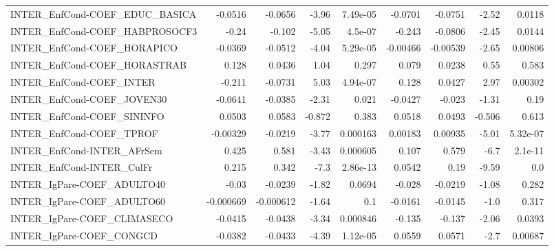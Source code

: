 \begin{tabular}{lrrrrrrrr}
INTER\_EnfCond-COEF\_EDUC\_BASICA        &     -0.0516 &      -0.0656 &    -3.96 & 7.49e-05 &    -0.0701 &     -0.0751 &        -2.52 &        0.0118 \\
INTER\_EnfCond-COEF\_HABPROSOCF3        &       -0.24 &       -0.102 &    -5.05 &  4.5e-07 &     -0.243 &     -0.0806 &        -2.45 &        0.0144 \\
INTER\_EnfCond-COEF\_HORAPICO           &     -0.0369 &      -0.0512 &    -4.04 & 5.29e-05 &   -0.00466 &    -0.00539 &        -2.65 &       0.00806 \\
INTER\_EnfCond-COEF\_HORASTRAB          &       0.128 &       0.0436 &     1.04 &    0.297 &      0.079 &      0.0238 &         0.55 &         0.583 \\
INTER\_EnfCond-COEF\_INTER              &      -0.211 &      -0.0731 &     5.03 & 4.94e-07 &      0.128 &      0.0427 &         2.97 &       0.00302 \\
INTER\_EnfCond-COEF\_JOVEN30            &     -0.0641 &      -0.0385 &    -2.31 &    0.021 &    -0.0427 &      -0.023 &        -1.31 &          0.19 \\
INTER\_EnfCond-COEF\_SININFO            &      0.0503 &       0.0583 &   -0.872 &    0.383 &     0.0518 &      0.0493 &       -0.506 &         0.613 \\
INTER\_EnfCond-COEF\_TPROF              &    -0.00329 &      -0.0219 &    -3.77 & 0.000163 &    0.00183 &     0.00935 &        -5.01 &      5.32e-07 \\
INTER\_EnfCond-INTER\_AFrSem            &       0.425 &        0.581 &    -3.43 & 0.000605 &      0.107 &       0.579 &         -6.7 &       2.1e-11 \\
INTER\_EnfCond-INTER\_CulFr             &       0.215 &        0.342 &     -7.3 & 2.86e-13 &     0.0542 &        0.19 &        -9.59 &           0.0 \\
INTER\_IgPare-COEF\_ADULTO40            &       -0.03 &      -0.0239 &    -1.82 &   0.0694 &     -0.028 &     -0.0219 &        -1.08 &         0.282 \\
INTER\_IgPare-COEF\_ADULTO60            &   -0.000669 &    -0.000612 &    -1.64 &      0.1 &    -0.0161 &     -0.0145 &         -1.0 &         0.317 \\
INTER\_IgPare-COEF\_CLIMASECO           &     -0.0415 &      -0.0438 &    -3.34 & 0.000846 &     -0.135 &      -0.137 &        -2.06 &        0.0393 \\
INTER\_IgPare-COEF\_CONGCD              &     -0.0382 &      -0.0433 &    -4.39 & 1.12e-05 &     0.0559 &      0.0571 &         -2.7 &       0.00687 \\

\end{tabular}
